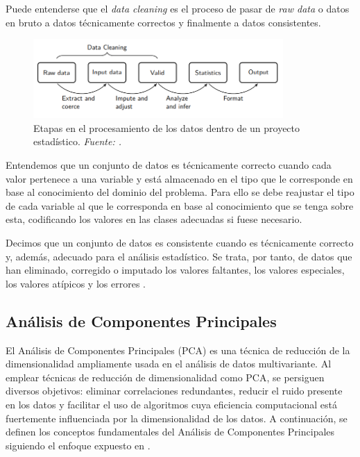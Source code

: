 \documentclass[12pt,a4paper,]{book}
\numberwithin{dummy}{section}
\theoremstyle{ocrenumbox}
\theoremstyle{blacknumex}
\theoremstyle{blacknumbox}
\theoremstyle{ocrenum}
\theoremstyle{ocrenum}
\begin{document}
Puede entenderse que el \emph{data cleaning} es el proceso de pasar de
\emph{raw data} o datos en bruto a datos técnicamente correctos y
finalmente a datos consistentes.

\begin{figure}[H]
\centering
\includegraphics[width = 0.85\textwidth]{graficos/statistical_value_chain.png}
\caption[Etapas en el procesamiento de los datos dentro de un proyecto estadístico]{Etapas en el procesamiento de los datos dentro de un proyecto estadístico. \it Fuente: \citet{van2018statistical}.}
\label{fig:stat_val}
\end{figure}

Entendemos que un conjunto de datos es técnicamente correcto cuando cada
valor pertenece a una variable y está almacenado en el tipo que le
corresponde en base al conocimiento del dominio del problema. Para ello
se debe reajustar el tipo de cada variable al que le corresponda en base
al conocimiento que se tenga sobre esta, codificando los valores en las
clases adecuadas si fuese necesario.

Decimos que un conjunto de datos es consistente cuando es técnicamente
correcto y, además, adecuado para el análisis estadístico. Se trata, por
tanto, de datos que han eliminado, corregido o imputado los valores
faltantes, los valores especiales, los valores atípicos y los errores
\citep{de2013introduction}.

\hypertarget{anuxe1lisis-de-componentes-principales}{%
\subsection{Análisis de Componentes
Principales}\label{anuxe1lisis-de-componentes-principales}}

El Análisis de Componentes Principales (PCA) es una técnica de reducción
de la dimensionalidad ampliamente usada en el análisis de datos
multivariante. Al emplear técnicas de reducción de dimensionalidad como
PCA, se persiguen diversos objetivos: eliminar correlaciones
redundantes, reducir el ruido presente en los datos y facilitar el uso
de algoritmos cuya eficiencia computacional está fuertemente
influenciada por la dimensionalidad de los datos. A continuación, se
definen los conceptos fundamentales del Análisis de Componentes
Principales siguiendo el enfoque expuesto en \citet{PCAShaoDeng}.
\end{document}

